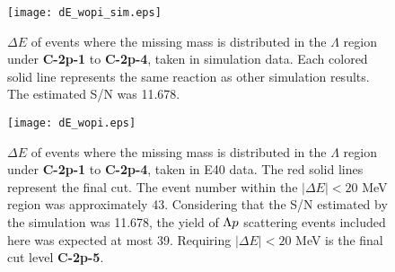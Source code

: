 \begin{figure}[!h]
  \begin{center}
    \texttt{[image: dE\_wopi\_sim.eps]}
    \caption{$\Delta E$ of events where the missing mass is distributed in the $\Lambda$ region under {\bf C-2p-1} to {\bf C-2p-4}, taken in simulation data. Each colored solid line represents the same reaction as other simulation results. The estimated S/N was 11.678.}
    \label{fig-dE_wopi_sim}
  \end{center}
\end{figure}

\begin{figure}[!h]
  \begin{center}
    \texttt{[image: dE\_wopi.eps]}
    \caption{$\Delta E$ of events where the missing mass is distributed in the $\Lambda$ region under {\bf C-2p-1} to {\bf C-2p-4}, taken in E40 data. The red solid lines represent the final cut. The event number within the $|\Delta E|<20$ MeV region was approximately 43. Considering that the S/N estimated by the simulation was 11.678, the yield of $\Lambda p$ scattering events included here was expected at most 39. Requiring $|\Delta E|<20$ MeV is the final cut level {\bf C-2p-5}.}
    \label{fig-dE_wopi}
  \end{center}
\end{figure}




